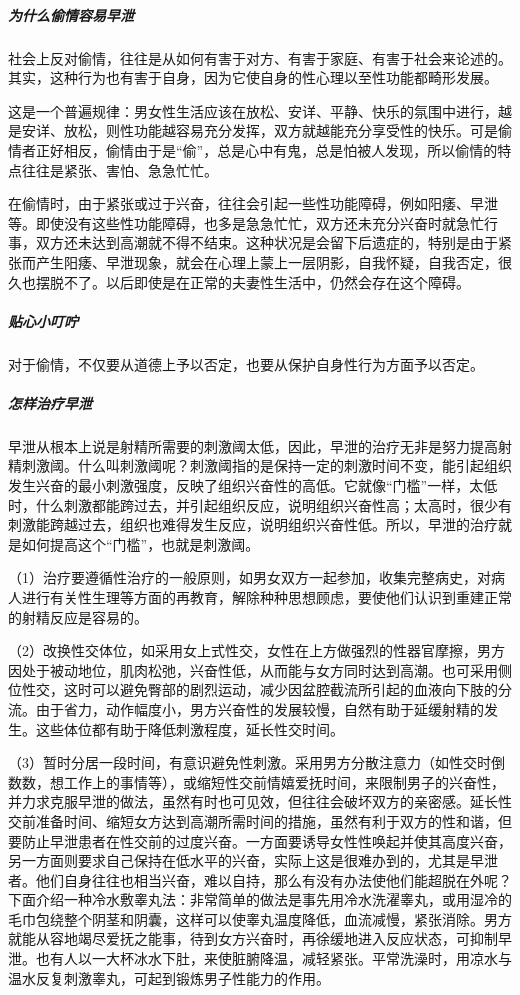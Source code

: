 \begin{enumerate}
\subparagraph{为什么偷情容易早泄}

社会上反对偷情，往往是从如何有害于对方、有害于家庭、有害于社会来论述的。其实，这种行为也有害于自身，因为它使自身的性心理以至性功能都畸形发展。

这是一个普遍规律：男女性生活应该在放松、安详、平静、快乐的氛围中进行，越是安详、放松，则性功能越容易充分发挥，双方就越能充分享受性的快乐。可是偷情者正好相反，偷情由于是“偷”，总是心中有鬼，总是怕被人发现，所以偷情的特点往往是紧张、害怕、急急忙忙。

在偷情时，由于紧张或过于兴奋，往往会引起一些性功能障碍，例如阳痿、早泄等。即使没有这些性功能障碍，也多是急急忙忙，双方还未充分兴奋时就急忙行事，双方还未达到高潮就不得不结束。这种状况是会留下后遗症的，特别是由于紧张而产生阳痿、早泄现象，就会在心理上蒙上一层阴影，自我怀疑，自我否定，很久也摆脱不了。以后即使是在正常的夫妻性生活中，仍然会存在这个障碍。

\subparagraph{贴心小叮咛}

对于偷情，不仅要从道德上予以否定，也要从保护自身性行为方面予以否定。

\subparagraph{怎样治疗早泄}

早泄从根本上说是射精所需要的刺激阈太低，因此，早泄的治疗无非是努力提高射精刺激阈。什么叫刺激阈呢？刺激阈指的是保持一定的刺激时间不变，能引起组织发生兴奋的最小刺激强度，反映了组织兴奋性的高低。它就像“门槛”一样，太低时，什么刺激都能跨过去，并引起组织反应，说明组织兴奋性高；太高时，很少有刺激能跨越过去，组织也难得发生反应，说明组织兴奋性低。所以，早泄的治疗就是如何提高这个“门槛”，也就是刺激阈。

（1）治疗要遵循性治疗的一般原则，如男女双方一起参加，收集完整病史，对病人进行有关性生理等方面的再教育，解除种种思想顾虑，要使他们认识到重建正常的射精反应是容易的。

（2）改换性交体位，如采用女上式性交，女性在上方做强烈的性器官摩擦，男方因处于被动地位，肌肉松弛，兴奋性低，从而能与女方同时达到高潮。也可采用侧位性交，这时可以避免臀部的剧烈运动，减少因盆腔截流所引起的血液向下肢的分流。由于省力，动作幅度小，男方兴奋性的发展较慢，自然有助于延缓射精的发生。这些体位都有助于降低刺激程度，延长性交时间。

（3）暂时分居一段时间，有意识避免性刺激。采用男方分散注意力（如性交时倒数数，想工作上的事情等），或缩短性交前情嬉爱抚时间，来限制男子的兴奋性，并力求克服早泄的做法，虽然有时也可见效，但往往会破坏双方的亲密感。延长性交前准备时间、缩短女方达到高潮所需时间的措施，虽然有利于双方的性和谐，但要防止早泄患者在性交前的过度兴奋。一方面要诱导女性性唤起并使其高度兴奋，另一方面则要求自己保持在低水平的兴奋，实际上这是很难办到的，尤其是早泄者。他们自身往往也相当兴奋，难以自持，那么有没有办法使他们能超脱在外呢？下面介绍一种冷水敷睾丸法：非常简单的做法是事先用冷水洗濯睾丸，或用湿冷的毛巾包绕整个阴茎和阴囊，这样可以使睾丸温度降低，血流减慢，紧张消除。男方就能从容地竭尽爱抚之能事，待到女方兴奋时，再徐缓地进入反应状态，可抑制早泄。也有人以一大杯冰水下肚，来使脏腑降温，减轻紧张。平常洗澡时，用凉水与温水反复刺激睾丸，可起到锻炼男子性能力的作用。


\end{enumerate}
